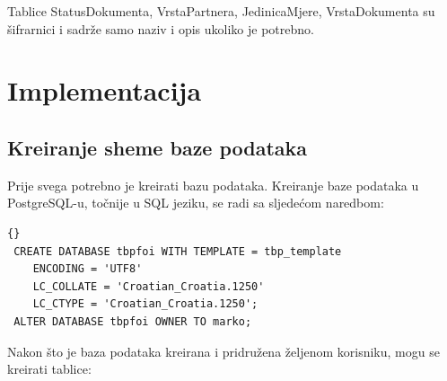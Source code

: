 \documentclass[a4paper,12pt]{foi}
\begin{document}
Tablice Status\textunderscore Dokumenta, Vrsta\textunderscore Partnera, Jedinica\textunderscore Mjere, Vrsta\textunderscore Dokumenta su šifrarnici i sadrže samo naziv i opis ukoliko je potrebno. 

\chapter{Implementacija}

\section{Kreiranje sheme baze podataka}

Prije svega potrebno je kreirati bazu podataka. Kreiranje baze podataka u PostgreSQL-u, točnije u SQL jeziku, se radi sa sljedećom naredbom:

\lstset{commentstyle=\textit,language=SQL}
\begin{lstlisting}[frame=tb]{}
 CREATE DATABASE tbpfoi WITH TEMPLATE = tbp_template 
 	ENCODING = 'UTF8' 
 	LC_COLLATE = 'Croatian_Croatia.1250' 
 	LC_CTYPE = 'Croatian_Croatia.1250';
 ALTER DATABASE tbpfoi OWNER TO marko;
\end{lstlisting}

Nakon što je baza podataka kreirana i pridružena željenom korisniku, mogu se kreirati tablice:
\end{document}
